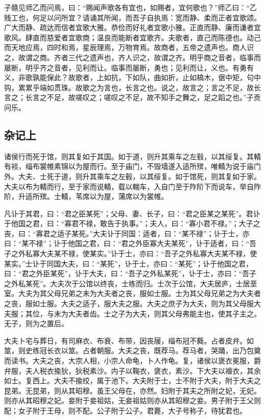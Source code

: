 \documentclass[]{article}
\begin{document}
子赣见师乙而问焉，曰：``赐闻声歌各有宜也，如赐者，宜何歌也？''师乙曰：``乙贱工也，何足以问所宜？请诵其所闻，而吾子自执焉：宽而静、柔而正者宜歌颂。广大而静、疏达而信者宜歌大雅。恭俭而好礼者宜歌小雅。正直而静、廉而谦者宜歌风。肆直而慈爱者宜歌商；温良而能断者宜歌齐。夫歌者，直己而陈德也。动己而天地应焉，四时和焉，星辰理焉，万物育焉。故商者，五帝之遗声也。商人识之，故谓之商。齐者三代之遗声也，齐人识之，故谓之齐。明乎商之音者，临事而屡断，明乎齐之音者，见利而让。临事而屡断，勇也；见利而让，义也。有勇有义，非歌孰能保此？故歌者，上如抗，下如队，曲如折，止如槁木，倨中矩，句中钩，累累乎端如贯珠。故歌之为言也，长言之也。说之，故言之；言之不足，故长言之；长言之不足，故嗟叹之；嗟叹之不足，故不知手之舞之，足之蹈之也。''子贡问乐。

\hypertarget{header-n557}{%
\subsection{杂记上}\label{header-n557}}

诸侯行而死于馆，则其复如于其国。如于道，则升其乘车之左毂，以其绥复。其輤有裧，缁布裳帷素锦以为屋而行。至于庙门，不毁墙遂入适所殡，唯輤为说于庙门外。大夫、士死于道，则升其乘车之左毂，以其绥复。如于馆死，则其复如于家。大夫以布为輤而行，至于家而说輤，载以輲车，入自门至于阼阶下而说车，举自阼阶，升适所殡。士輤，苇席以为屋，蒲席以为裳帷。

凡讣于其君，曰：``君之臣某死''；父母、妻、长子，曰：``君之臣某之某死''。君讣于他国之君，曰：``寡君不禄，敢告于执事。''；夫人，曰：``寡小君不禄。''；大子之丧，曰：``寡君之适子某死。''大夫讣于同国：适者，曰：``某不禄''；讣于士，亦曰：``某不禄''；讣于他国之君，曰：``君之外臣寡大夫某死''，讣于适者，曰：``吾子之外私寡大夫某不禄，使某实。''讣于士，亦曰：``吾子之外私寡大夫某不禄，使某实。''士讣于同国大夫，曰：``某死''，讣于士，亦曰：``某死''；讣于他国之君，曰：``君之外臣某死''，讣于大夫，曰：``吾子之外私某死''，讣于士，亦曰：``吾子之外私某死''。大夫次于公馆以终丧，士练而归。士次于公馆，大夫居庐，士居垩室。大夫为其父母兄弟之未为大夫者之丧，服如士服。士为其父母兄弟之为大夫者之丧，服如士服。大夫之适子，服大夫之服。大夫之庶子为大夫，则为其父母服大夫服；其位，与未为大夫者齿。士之子为大夫，则其父母弗能主也，使其子主之。无子，则为之置后。

大夫卜宅与葬日，有司麻衣、布衰、布带，因丧屦，缁布冠不蕤。占者皮弁。如筮，则史练冠长衣以筮。占者朝服。大夫之丧，既荐马。荐马者，哭踊，出乃包奠而读书。大夫之丧，大宗人相，小宗人命龟，卜人作龟。复，诸侯以褒衣冕服，爵弁服，夫人税衣揄狄，狄税素沙。内子以鞠衣，褒衣，素沙。下大夫以襢衣，其余如士。复西上。大夫不揄绞，属于池下。大夫附于士，士不附于大夫，附于大夫之昆弟。无昆弟，则从其昭穆。虽王父母在，亦然。妇附于其夫之所附之妃，无妃。则亦从其昭穆之妃。妾附于妾祖姑，无妾祖姑则亦从其昭穆之妾。男子附于王父则配；女子附于王母，则不配。公子附于公子。君薨，大子号称子，待犹君也。
\end{document}
